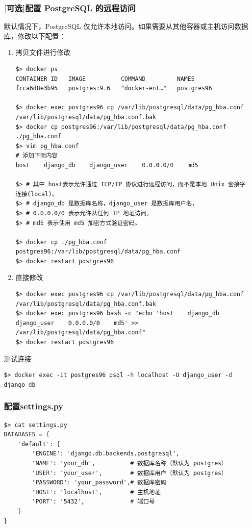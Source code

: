 \subsubsection{[可选]配置 PostgreSQL 的远程访问}
默认情况下，PostgreSQL 仅允许本地访问。如果需要从其他容器或主机访问数据库，修改以下配置：
\begin{enumerate}[label=\arabic*)]
    \item 拷贝文件进行修改

\begin{lstlisting}[style=demostyle,numbers=none]
$> docker ps 
CONTAINER ID   IMAGE          COMMAND         NAMES
fcca6d8e3b95   postgres:9.6   "docker-ent…"   postgres96

$> docker exec postgres96 cp /var/lib/postgresql/data/pg_hba.conf /var/lib/postgresql/data/pg_hba.conf.bak
$> docker cp postgres96:/var/lib/postgresql/data/pg_hba.conf ./pg_hba.conf
$> vim pg_hba.conf
# 添加下面内容
host    django_db    django_user    0.0.0.0/0    md5

$> # 其中 host表示允许通过 TCP/IP 协议进行远程访问，而不是本地 Unix 套接字连接(local)。
$> # django_db 是数据库名称，django_user 是数据库用户名，
$> # 0.0.0.0/0 表示允许从任何 IP 地址访问。
$> # md5 表示使用 md5 加密方式验证密码。

$> docker cp ./pg_hba.conf postgres96:/var/lib/postgresql/data/pg_hba.conf
$> docker restart postgres96
\end{lstlisting}

    \item 直接修改
\begin{lstlisting}[style=demostyle,numbers=none]
$> docker exec postgres96 cp /var/lib/postgresql/data/pg_hba.conf /var/lib/postgresql/data/pg_hba.conf.bak
$> docker exec postgres96 bash -c "echo 'host    django_db    django_user    0.0.0.0/0    md5' >> /var/lib/postgresql/data/pg_hba.conf"
$> docker restart postgres96
\end{lstlisting}        
\end{enumerate}

测试连接
\begin{lstlisting}[style=demostyle,numbers=none]
$> docker exec -it postgres96 psql -h localhost -U django_user -d django_db
\end{lstlisting}


\subsubsection{配置settings.py}
\begin{lstlisting}[style=demostyle,numbers=none]
$> cat settings.py    
DATABASES = {
    'default': {
        'ENGINE': 'django.db.backends.postgresql',
        'NAME': 'your_db',          # 数据库名称（默认为 postgres）
        'USER': 'your_user',        # 数据库用户（默认为 postgres）
        'PASSWORD': 'your_password',# 数据库密码
        'HOST': 'localhost',        # 主机地址
        'PORT': '5432',             # 端口号
    }
}
\end{lstlisting}


